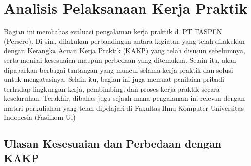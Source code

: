 \section{Analisis Pelaksanaan Kerja Praktik}
\label{sec:analisisPelaksanaan}
Bagian ini membahas evaluasi pengalaman kerja praktik di PT TASPEN (Persero). Di sini, dilakukan perbandingan antara kegiatan yang telah dilakukan dengan Kerangka Acuan Kerja Praktik (KAKP) yang telah disusun sebelumnya, serta menilai kesesuaian maupun perbedaan yang ditemukan. Selain itu, akan dipaparkan berbagai tantangan yang muncul selama kerja praktik dan solusi untuk mengatasinya. Selain itu, bagian ini juga memuat penilaian pribadi terhadap lingkungan kerja, pembimbing, dan proses kerja praktik secara keseluruhan. Terakhir, dibahas juga sejauh mana pengalaman ini relevan dengan materi perkuliahan yang telah dipelajari di Fakultas Ilmu Komputer Universitas Indonesia (Fasilkom UI)

\subsection{Ulasan Kesesuaian dan Perbedaan dengan KAKP}
\label{sec:kesesuaianKAKP}

